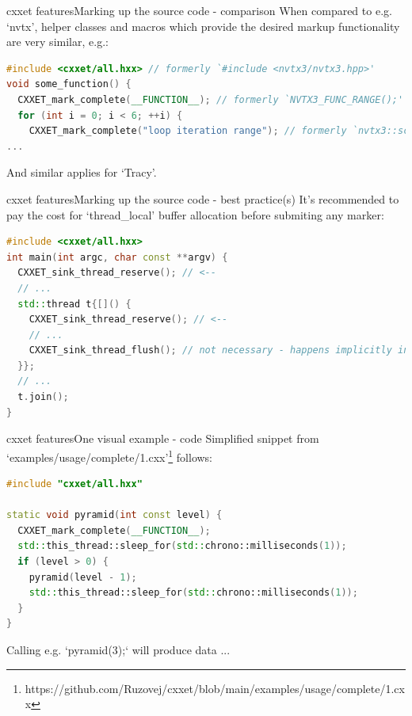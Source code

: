 \documentclass[aspectratio=169]{beamer}
\begin{document}
\begin{frame}[fragile]{cxxet features}{Marking up the source code - comparison}
    When compared to e.g. `nvtx', helper classes and macros which provide the desired markup functionality are very similar, e.g.:

    \begin{lstlisting}[language=C++]
#include <cxxet/all.hxx> // formerly `#include <nvtx3/nvtx3.hpp>'
void some_function() {
  CXXET_mark_complete(__FUNCTION__); // formerly `NVTX3_FUNC_RANGE();'
  for (int i = 0; i < 6; ++i) {
    CXXET_mark_complete("loop iteration range"); // formerly `nvtx3::scoped_range loop{"loop iteration range"};'
...
    \end{lstlisting}

    And similar applies for `Tracy'.

\end{frame}

\begin{frame}[fragile]{cxxet features}{Marking up the source code - best practice(s)}
    It's recommended to pay the cost for `thread\_local' buffer allocation before submiting any marker:

    \begin{lstlisting}[language=C++]
#include <cxxet/all.hxx>
int main(int argc, char const **argv) {
  CXXET_sink_thread_reserve(); // <--
  // ...
  std::thread t{[]() {
    CXXET_sink_thread_reserve(); // <--
    // ...
    CXXET_sink_thread_flush(); // not necessary - happens implicitly in the internal `thread_local' object destructor
  }};
  // ...
  t.join();
}
    \end{lstlisting}

\end{frame}

\begin{frame}[fragile]{cxxet features}{One visual example - code}
    Simplified snippet from `examples/usage/complete/1.cxx'\footnote{https://github.com/Ruzovej/cxxet/blob/main/examples/usage/complete/1.cxx} follows:

    \begin{lstlisting}[language=C++]
#include "cxxet/all.hxx"

static void pyramid(int const level) {
  CXXET_mark_complete(__FUNCTION__);
  std::this_thread::sleep_for(std::chrono::milliseconds(1));
  if (level > 0) {
    pyramid(level - 1);
    std::this_thread::sleep_for(std::chrono::milliseconds(1));
  }
}
    \end{lstlisting}

    Calling e.g. `pyramid(3);` will produce data ...

\end{frame}
\end{document}
